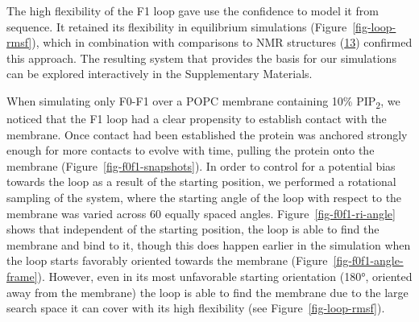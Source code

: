 \documentclass[
  twocolumn]{biophys-new-mod}
\begin{document}
The high flexibility of the F1 loop gave use the confidence to model it
from sequence. It retained its flexibility in equilibrium simulations
(Figure~\ref{fig-loop-rmsf}), which in combination with comparisons to
NMR structures
(\protect\hyperlink{ref-goultStructureDoubleUbiquitinlike2010}{13})
confirmed this approach. The resulting system that provides the basis
for our simulations can be explored interactively in the Supplementary
Materials.

When simulating only F0-F1 over a POPC membrane containing 10\%
PIP\textsubscript{2}, we noticed that the F1 loop had a clear propensity
to establish contact with the membrane. Once contact had been
established the protein was anchored strongly enough for more contacts
to evolve with time, pulling the protein onto the membrane
(Figure~\ref{fig-f0f1-snapshots}). In order to control for a potential
bias towards the loop as a result of the starting position, we performed
a rotational sampling of the system, where the starting angle of the
loop with respect to the membrane was varied across 60 equally spaced
angles. Figure~\ref{fig-f0f1-ri-angle} shows that independent of the
starting position, the loop is able to find the membrane and bind to it,
though this does happen earlier in the simulation when the loop starts
favorably oriented towards the membrane
(Figure~\ref{fig-f0f1-angle-frame}). However, even in its most
unfavorable starting orientation (180°, oriented away from the membrane)
the loop is able to find the membrane due to the large search space it
can cover with its high flexibility (see Figure~\ref{fig-loop-rmsf}).
\end{document}

